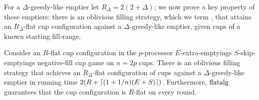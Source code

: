 For a $\Delta$-greedy-like emptier let $R_\Delta = 2(2+\Delta)$;
we now prove a key property of these emptiers: there is an
oblivious filling strategy, which we term , that
attains an $R_\Delta$-flat cup configuration against a
$\Delta$-greedy-like emptier, given cups of a known starting
fill-range.


\begin{lemma}
  \label{lem:greedylikeisflat}
  Consider an $R$-flat cup configuration in the $p$-processor
  $E$-extra-emptyings $S$-skip-emptyings negative-fill cup game on $n =
  2p$ cups. There is an oblivious filling strategy
   that achieves an $R_\Delta$-flat
  configuration of cups against a $\Delta$-greedy-like emptier in
  running time $2(R + \left\lceil (1+1/n)(E + S) \right\rceil)$. Furthermore,
  $\operatorname{\text{\textup{flatalg}}}$ guarantees that the cup configuration is $R$-flat on every round.
\end{lemma}
